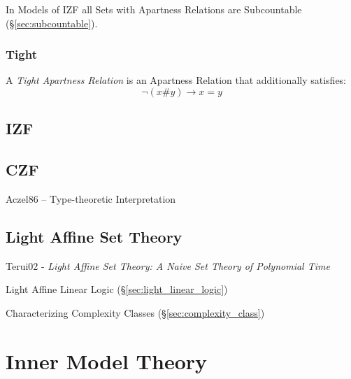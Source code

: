 In Models of IZF all Sets with Apartness Relations are Subcountable
(\S\ref{sec:subcountable}).



\subsubsection{Tight}\label{sec:tight}

A \emph{Tight Apartness Relation} is an Apartness Relation that
additionally satisfies:
\[
  \neg (x \# y) \to x = y
\]



\subsection{IZF}\label{sec:izf}

\subsection{CZF}\label{sec:czf}

Aczel86 -- Type-theoretic Interpretation



\subsection{Light Affine Set Theory}\label{sec:light_affine_set_theory}

Terui02 - \emph{Light Affine Set Theory: A Naive Set Theory of Polynomial Time}

Light Affine Linear Logic (\S\ref{sec:light_linear_logic})

Characterizing Complexity Classes (\S\ref{sec:complexity_class})



\section{Inner Model Theory}\label{sec:inner_model_theory}

